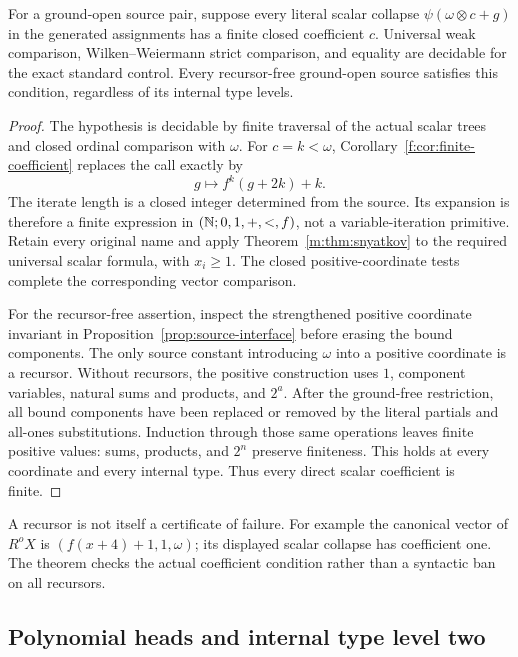 \begin{theorem}
\label{thm:source-finite}
For a ground-open source pair, suppose every literal scalar collapse
$\psi(\omega\otimes c+g)$ in the generated assignments has a finite
closed coefficient $c$.  Universal weak comparison, Wilken--Weiermann
strict comparison, and equality are decidable for the exact standard
control.  Every recursor-free ground-open source satisfies this condition,
regardless of its internal type levels.
\end{theorem}
\begin{proof}
The hypothesis is decidable by finite traversal of the actual scalar
trees and closed ordinal comparison with $\omega$.  For $c=k<\omega$,
Corollary~\ref{f:cor:finite-coefficient} replaces the call exactly by
\[
          g\longmapsto f^k(g+2k)+k.
\]
The iterate length is a closed integer determined from the source.  Its
expansion is therefore a finite expression in $(\mathbb N;0,1,+,<,f)$,
not a variable-iteration primitive.  Retain every original name and apply
Theorem~\ref{m:thm:snyatkov} to the required universal scalar formula,
with $x_i\ge1$.  The closed positive-coordinate tests complete the
corresponding vector comparison.

For the recursor-free assertion, inspect the strengthened positive
coordinate invariant in Proposition~\ref{prop:source-interface} before
erasing the bound components.  The only source constant introducing
$\omega$ into a positive coordinate is a recursor.  Without recursors,
the positive construction uses $1$, component variables, natural sums
and products, and $2^a$.  After the ground-free restriction, all bound
components have been replaced or removed by the literal partials and
all-ones substitutions.  Induction through those same operations leaves
finite positive values: sums, products, and $2^n$ preserve finiteness.
This holds at every coordinate and every internal type.  Thus every
direct scalar coefficient is finite.
\end{proof}

A recursor is not itself a certificate of failure.  For example the
canonical vector of $R^oX$ is $(f(x+4)+1,1,\omega)$; its displayed
scalar collapse has coefficient one.  The theorem checks the actual
coefficient condition rather than a syntactic ban on all recursors.

\subsection{Polynomial heads and internal type level two}

